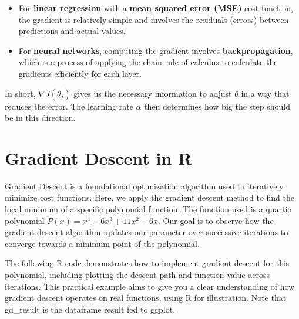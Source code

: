 \documentclass[
  12 pt,
  a4paper,
]{book}
\providecommand{\tightlist}{%
  \setlength{\itemsep}{0pt}\setlength{\parskip}{0pt}}
\numberwithin{equation}{section}
\theoremstyle{plain}      %
\theoremstyle{definition} %
\theoremstyle{remark}     %
\theoremstyle{note}         %
\begin{document}
\begin{itemize}
  \begin{itemize}
  \tightlist
  \item
    For \textbf{linear regression} with a \textbf{mean squared error
    (MSE)} cost function, the gradient is relatively simple and involves
    the residuals (errors) between predictions and actual values.
  \item
    For \textbf{neural networks}, computing the gradient involves
    \textbf{backpropagation}, which is a process of applying the chain
    rule of calculus to calculate the gradients efficiently for each
    layer.
  \end{itemize}
\end{itemize}

In short, \(\nabla J(\theta_j)\) gives us the necessary information to
adjust \(\theta\) in a way that reduces the error. The learning rate
\(\alpha\) then determines how big the step should be in this direction.

\newpage

\hypertarget{gradient-descent-in-r}{%
\section{Gradient Descent in R}\label{gradient-descent-in-r}}

Gradient Descent is a foundational optimization algorithm used to
iteratively minimize cost functions. Here, we apply the gradient descent
method to find the local minimum of a specific polynomial function. The
function used is a quartic polynomial
\(P(x) = x^4 - 6x^3 + 11x^2 - 6x\). Our goal is to observe how the
gradient descent algorithm updates our parameter over successive
iterations to converge towards a minimum point of the polynomial.

The following R code demonstrates how to implement gradient descent for
this polynomial, including plotting the descent path and function value
across iterations. This practical example aims to give you a clear
understanding of how gradient descent operates on real functions, using
R for illustration. Note that gd\_result is the dataframe result fed to
ggplot.\\

\scriptsize
\end{document}
